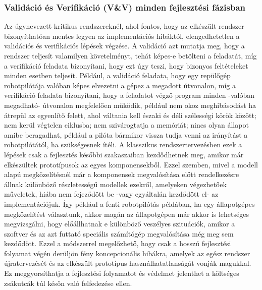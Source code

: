         \subsubsection{Validáció és Verifikáció (V\&V) minden fejlesztési fázisban} \label{sec:VaVmindenutt}
        Az úgynevezett kritikus rendszereknél, ahol fontos, hogy az elkészült rendszer bizonyíthatóan mentes legyen az implementációs hibáktól, elengedhetetlen a validációs és verifikációs lépések végzése. A validáció azt mutatja meg, hogy a rendszer teljesít valamilyen követelményt, tehát képes-e betölteni a feladatát, míg a verifikáció feladata bizonyítani, hogy ezt úgy teszi, hogy bizonyos feltételeket minden esetben teljesít. Például, a validáció feladata, hogy egy repülőgép robotpilótája valóban képes elvezetni a gépez a megadott útvonalon, míg a verifikáció feladata bizonyítani, hogy a feladatot végző program minden -valóban megadható- útvonalon megfelelően működik, például nem okoz meghibásodást ha átrepül az egyenlítő felett, ahol váltania kell északi és déli szélességi körök között; nem kerül végtelen ciklusba; nem szivárogtatja a memóriát; nincs olyan állapot amibe beragadhat, például a pilóta bármikor vissza tudja venni az irányítást a robotpilótától, ha szükségesnek ítéli.
        A klasszikus rendszertervezésben ezek a lépések csak a fejlesztés későbbi szakaszaiban kezdődhetnek meg, amikor már elkészültek prototípusok az egyes komponensekből.
        Ezzel szemben, mivel a modell alapú megközelítésnél már a komponensek megvalósítása előtt rendelkezésre állnak különböző részletességű modellek ezekről, amelyeken végezhetőek műveletek, hiába nem fejeződött be -vagy egyáltalán kezdődött el- az implementációjuk.
        Így például a fenti robotpilótás példában, ha egy állapotgépes megközelítést választunk, akkor magán az állapotgépen már akkor is lehetséges megvizsgálni, hogy előállhatnak e különböző veszélyes szituációk, amikor a szoftver és az azt futtató speciális számítógép megvalósítása még meg sem kezdődött.
        Ezzel a módszerrel megelőzhető, hogy csak a hosszú fejlesztési folyamat végén derüljön fény koncepcionális hibákra, amelyek az egész rendszer újratervezését és az elkészült prototípus használhatatlanságát vonják magukkal.
        Ez meggyorsíthatja a fejlesztési folyamatot és védelmet jelenthet a költséges zsákutcák túl későn való felfedezése ellen.
        

